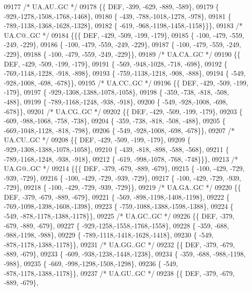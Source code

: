 \begin{DoxyCode}
09177 \textcolor{comment}{/* UA.AU..GC */}
09178 \{\{  DEF, -399, -629, -889, -589\},
09179 \{ -929,-1278,-1508,-1768,-1468\},
09180 \{ -439, -788,-1018,-1278, -978\},
09181 \{ -789,-1138,-1368,-1628,-1328\},
09182 \{ -619, -968,-1198,-1458,-1158\}\}\},
09183 \textcolor{comment}{/* UA.C@..GC */}
09184 \{\{\{  DEF, -429, -509, -199, -179\},
09185 \{ -100, -479, -559, -249, -229\},
09186 \{ -100, -479, -559, -249, -229\},
09187 \{ -100, -479, -559, -249, -229\},
09188 \{ -100, -479, -559, -249, -229\}\},
09189 \textcolor{comment}{/* UA.CA..GC */}
09190 \{\{  DEF, -429, -509, -199, -179\},
09191 \{ -569, -948,-1028, -718, -698\},
09192 \{ -769,-1148,-1228, -918, -898\},
09193 \{ -759,-1138,-1218, -908, -888\},
09194 \{ -549, -928,-1008, -698, -678\}\},
09195 \textcolor{comment}{/* UA.CC..GC */}
09196 \{\{  DEF, -429, -509, -199, -179\},
09197 \{ -929,-1308,-1388,-1078,-1058\},
09198 \{ -359, -738, -818, -508, -488\},
09199 \{ -789,-1168,-1248, -938, -918\},
09200 \{ -549, -928,-1008, -698, -678\}\},
09201 \textcolor{comment}{/* UA.CG..GC */}
09202 \{\{  DEF, -429, -509, -199, -179\},
09203 \{ -609, -988,-1068, -758, -738\},
09204 \{ -359, -738, -818, -508, -488\},
09205 \{ -669,-1048,-1128, -818, -798\},
09206 \{ -549, -928,-1008, -698, -678\}\},
09207 \textcolor{comment}{/* UA.CU..GC */}
09208 \{\{  DEF, -429, -509, -199, -179\},
09209 \{ -929,-1308,-1388,-1078,-1058\},
09210 \{ -439, -818, -898, -588, -568\},
09211 \{ -789,-1168,-1248, -938, -918\},
09212 \{ -619, -998,-1078, -768, -748\}\}\},
09213 \textcolor{comment}{/* UA.G@..GC */}
09214 \{\{\{  DEF, -379, -679, -889, -679\},
09215 \{ -100, -429, -729, -939, -729\},
09216 \{ -100, -429, -729, -939, -729\},
09217 \{ -100, -429, -729, -939, -729\},
09218 \{ -100, -429, -729, -939, -729\}\},
09219 \textcolor{comment}{/* UA.GA..GC */}
09220 \{\{  DEF, -379, -679, -889, -679\},
09221 \{ -569, -898,-1198,-1408,-1198\},
09222 \{ -769,-1098,-1398,-1608,-1398\},
09223 \{ -759,-1088,-1388,-1598,-1388\},
09224 \{ -549, -878,-1178,-1388,-1178\}\},
09225 \textcolor{comment}{/* UA.GC..GC */}
09226 \{\{  DEF, -379, -679, -889, -679\},
09227 \{ -929,-1258,-1558,-1768,-1558\},
09228 \{ -359, -688, -988,-1198, -988\},
09229 \{ -789,-1118,-1418,-1628,-1418\},
09230 \{ -549, -878,-1178,-1388,-1178\}\},
09231 \textcolor{comment}{/* UA.GG..GC */}
09232 \{\{  DEF, -379, -679, -889, -679\},
09233 \{ -609, -938,-1238,-1448,-1238\},
09234 \{ -359, -688, -988,-1198, -988\},
09235 \{ -669, -998,-1298,-1508,-1298\},
09236 \{ -549, -878,-1178,-1388,-1178\}\},
09237 \textcolor{comment}{/* UA.GU..GC */}
09238 \{\{  DEF, -379, -679, -889, -679\},

\end{DoxyCode}
